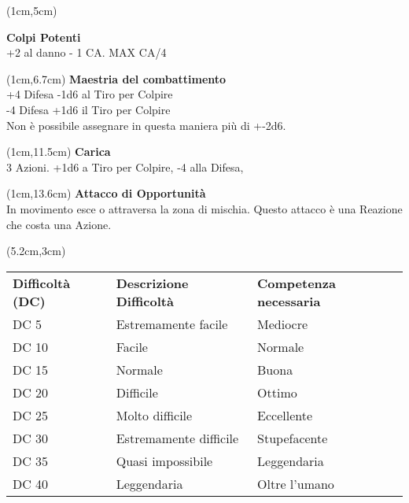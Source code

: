 \documentclass[a4paper,12 pt,openany]{book}
\begin{document}
\begin{textblock*}{4cm}(1cm,5cm) %

\textbf{Colpi Potenti}\\
+2 al danno - 1 CA. MAX CA/4

	\end{textblock*}	

\begin{textblock*}{4cm}(1cm,6.7cm) %
\textbf{Maestria del combattimento}\\
+4 Difesa -1d6 al Tiro per Colpire\\
-4 Difesa +1d6 il Tiro per Colpire \\
Non è possibile assegnare in questa maniera più di +-2d6.
	\end{textblock*}	


\begin{textblock*}{4cm}(1cm,11.5cm) %
\textbf{Carica}\\
3 Azioni. +1d6 a Tiro per Colpire, -4 alla Difesa,
\end{textblock*}	


\begin{textblock*}{4cm}(1cm,13.6cm) %
	\textbf{Attacco di Opportunità}\\
In movimento esce o attraversa la zona di mischia.
Questo attacco è una Reazione che costa una Azione.	
\end{textblock*}	
	
	\begin{textblock*}{15cm}(5.2cm,3cm) %
		\footnotesize 	
		\begin{tabular}{lll}
			\textbf{Difficoltà (DC)} & \textbf{Descrizione Difficoltà} & \textbf{ Competenza necessaria} \\
			DC 5                      & Estremamente facile              & Mediocre                        \\
			DC 10                     & Facile                           & Normale                         \\
			DC 15                     & Normale                          & Buona                           \\
			DC 20                     & Difficile                        & Ottimo                          \\
			DC 25                     & Molto difficile                  & Eccellente                      \\
			DC 30                     & Estremamente difficile           & Stupefacente                    \\
			DC 35                     & Quasi impossibile                & Leggendaria                     \\
			DC 40                     & Leggendaria                      & Oltre l'umano                   \\
		\end{tabular}
	\end{textblock*}
	
\end{document}

